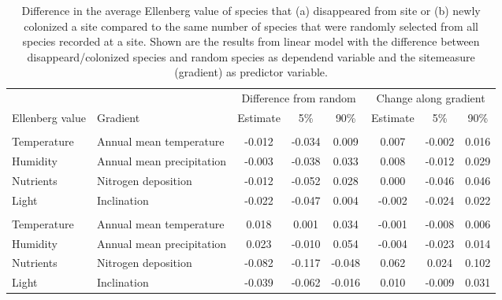 \documentclass[fleqn,10pt,lineno]{wlpeerj} %
\theoremstyle{definition}
\theoremstyle{definition}
\theoremstyle{definition}
\theoremstyle{remark}
\begin{document}
\begin{table}

\caption{\label{tab:difffromrandomtab}Difference in the average Ellenberg value of species that (a) disappeared from site or (b) newly colonized a site compared to the same number of species that were randomly selected from all species recorded at a site. Shown are the results from linear model with the difference between disappeard/colonized species and random species as dependend variable and the sitemeasure (gradient) as predictor variable.}
\centering
\begin{tabular}[t]{llcccccc}
\toprule
\multicolumn{2}{c}{ } & \multicolumn{3}{c}{Difference from random} & \multicolumn{3}{c}{Change along gradient} \\
\cmidrule(l{2pt}r{2pt}){3-5} \cmidrule(l{2pt}r{2pt}){6-8}
Ellenberg value & Gradient & Estimate & 5\% & 90\% & Estimate & 5\% & 90\%\\
\midrule
\addlinespace[0.3em]
\multicolumn{8}{l}{\textit{(a) Plants that disappeard from a site}}\\
\hspace{1em}Temperature & Annual mean temperature & -0.012 & -0.034 & 0.009 & 0.007 & -0.002 & 0.016\\
\hspace{1em}Humidity & Annual mean precipitation & -0.003 & -0.038 & 0.033 & 0.008 & -0.012 & 0.029\\
\hspace{1em}Nutrients & Nitrogen deposition & -0.012 & -0.052 & 0.028 & 0.000 & -0.046 & 0.046\\
\hspace{1em}Light & Inclination & -0.022 & -0.047 & 0.004 & -0.002 & -0.024 & 0.022\\
\addlinespace[0.3em]
\multicolumn{8}{l}{\textit{(b) Plants that newly colonized a site}}\\
\hspace{1em}Temperature & Annual mean temperature & 0.018 & 0.001 & 0.034 & -0.001 & -0.008 & 0.006\\
\hspace{1em}Humidity & Annual mean precipitation & 0.023 & -0.010 & 0.054 & -0.004 & -0.023 & 0.014\\
\hspace{1em}Nutrients & Nitrogen deposition & -0.082 & -0.117 & -0.048 & 0.062 & 0.024 & 0.102\\
\hspace{1em}Light & Inclination & -0.039 & -0.062 & -0.016 & 0.010 & -0.009 & 0.031\\
\bottomrule
\end{tabular}
\end{table}
\end{document}
